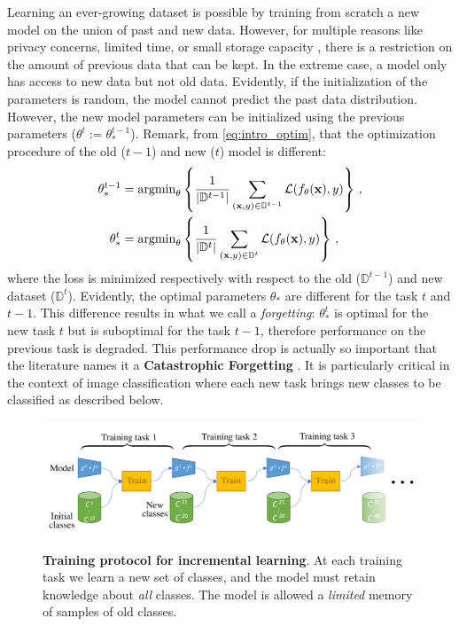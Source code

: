 Learning an ever-growing dataset is possible by training from scratch a new model on the union of
past and new data. However, for multiple reasons like privacy concerns, limited time, or small
storage capacity \citep{vasquez2017incrementalneuralforest}, there is a restriction on the amount of
previous data that can be kept. In the extreme case, a model only has access to new data but not old
data. Evidently, if the initialization of the parameters is random, the model cannot predict
the past data distribution. However, the new model parameters can be initialized using the
previous parameters ($\theta^{t} := \theta_*^{t-1}$). Remark, from \autoref{eq:intro_optim}, that
the optimization procedure of the old ($t-1$) and new ($t$) model is different:
%
\begin{equation}
      \begin{aligned}
            \theta_*^{t-1} & = \operatorname{argmin}_{\theta} \left \{ \frac{1}{|\mathbb{D}^{t-1}|}\sum_{(\mathbf{x},y)\in \mathbb{D}^{t-1}} \mathcal{L}(f_\theta(\mathbf{x}), y)\right \}\,, \\
            \theta_*^{t}   & = \operatorname{argmin}_{\theta} \left \{  \frac{1}{|\mathbb{D}^{t}|}\sum_{(\mathbf{x},y)\in \mathbb{D}^{t}} \mathcal{L}(f_\theta(\mathbf{x}), y)\right \}\,,
      \end{aligned}
      \label{eq:intro_forgetting_weights}
\end{equation}
%
where the loss is minimized respectively with respect to the old ($\mathbb{D}^{t-1}$) and new
dataset ($\mathbb{D}^{t}$). Evidently, the optimal parameters $\theta_*$ are different for the task
$t$ and $t-1$. This difference results in what we call a \textit{forgetting}: $\theta_*^t$ is
optimal for the new task $t$ but is suboptimal for the task $t-1$, therefore performance on the
previous task is degraded. This performance drop is actually so important that the literature names
it a \textbf{Catastrophic Forgetting} \citep{robins1995catastrophicforgetting}. It is particularly
critical in the context of image classification where each new task brings new classes to be
classified as described below.

\begin{figure}[tb]
      \begin{center}
            \includegraphics[width=1.0\linewidth]{images/related/protocol}
      \end{center}
      \caption{\textbf{Training protocol for incremental learning}. At each training task we learn a
            new set of classes, and the model must retain knowledge about \textit{all} classes. The
            model is allowed a \textit{limited} memory of samples of old classes.}
      \label{fig:related_protocol}
\end{figure}

